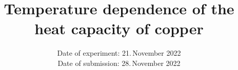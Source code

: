 

\subject{V47}
\title{Temperature dependence of the heat capacity of copper}
\date{%
  Date of experiment: 21.\,November 2022
  \\
  Date of submission: 28.\,November 2022
}



\maketitle
\thispagestyle{empty}
\tableofcontents
\newpage







\newpage
\printbibliography{}


